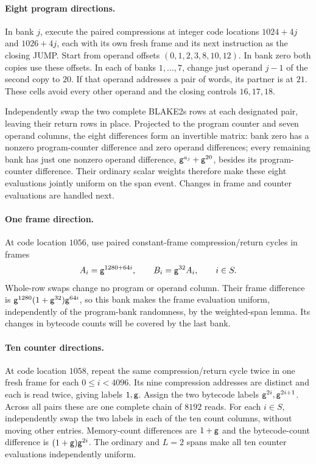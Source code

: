 \paragraph{Eight program directions.} In bank $j$, execute the paired compressions at integer code locations $1024+4j$ and $1026+4j$, each with its own fresh frame and its next instruction as the closing JUMP. Start from operand offsets $(0,1,2,3,8,10,12)$. In bank zero both copies use these offsets. In each of banks $1,\ldots,7$, change just operand $j-1$ of the second copy to $20$. If that operand addresses a pair of words, its partner is at $21$. These cells avoid every other operand and the closing controls $16,17,18$.

Independently swap the two complete BLAKE2s rows at each designated pair, leaving their return rows in place. Projected to the program counter and seven operand columns, the eight differences form an invertible matrix: bank zero has a nonzero program-counter difference and zero operand differences; every remaining bank has just one nonzero operand difference, $\mathsf{g}^{a_j}+\mathsf{g}^{20}$, besides its program-counter difference. Their ordinary scalar weights therefore make these eight evaluations jointly uniform on the span event. Changes in frame and counter evaluations are handled next.

\paragraph{One frame direction.} At code location $1056$, use paired constant-frame compression/return cycles in frames
\[
 A_i=\mathsf{g}^{1280+64i},\qquad B_i=\mathsf{g}^{32}A_i,\qquad i\in S.
\]
Whole-row swaps change no program or operand column. Their frame difference is $\mathsf{g}^{1280}(1+\mathsf{g}^{32})\mathsf{g}^{64i}$, so this bank makes the frame evaluation uniform, independently of the program-bank randomness, by the weighted-span lemma. Its changes in bytecode counts will be covered by the last bank.

\paragraph{Ten counter directions.} At code location $1058$, repeat the same compression/return cycle twice in one fresh frame for each $0\le i<4096$. Its nine compression addresses are distinct and each is read twice, giving labels $1,\mathsf{g}$. Assign the two bytecode labels $\mathsf{g}^{2i},\mathsf{g}^{2i+1}$. Across all pairs these are one complete chain of $8192$ reads. For each $i\in S$, independently swap the two labels in each of the ten count columns, without moving other entries. Memory-count differences are $1+\mathsf{g}$ and the bytecode-count difference is $(1+\mathsf{g})\mathsf{g}^{2i}$. The ordinary and $L=2$ spans make all ten counter evaluations independently uniform.

